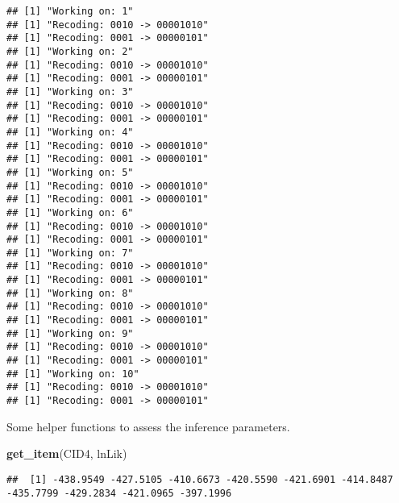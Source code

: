 \documentclass[
]{article}
\newenvironment{Shaded}{\begin{snugshade}}{\end{snugshade}}
\newcommand{\DecValTok}[1]{\textcolor[rgb]{0.00,0.00,0.81}{#1}}
\newcommand{\FunctionTok}[1]{\textcolor[rgb]{0.13,0.29,0.53}{\textbf{#1}}}
\newcommand{\NormalTok}[1]{#1}
\newcommand{\SpecialCharTok}[1]{\textcolor[rgb]{0.81,0.36,0.00}{\textbf{#1}}}
\newcommand{\StringTok}[1]{\textcolor[rgb]{0.31,0.60,0.02}{#1}}
\begin{document}
\begin{verbatim}
## [1] "Working on: 1"
## [1] "Recoding: 0010 -> 00001010"
## [1] "Recoding: 0001 -> 00000101"
## [1] "Working on: 2"
## [1] "Recoding: 0010 -> 00001010"
## [1] "Recoding: 0001 -> 00000101"
## [1] "Working on: 3"
## [1] "Recoding: 0010 -> 00001010"
## [1] "Recoding: 0001 -> 00000101"
## [1] "Working on: 4"
## [1] "Recoding: 0010 -> 00001010"
## [1] "Recoding: 0001 -> 00000101"
## [1] "Working on: 5"
## [1] "Recoding: 0010 -> 00001010"
## [1] "Recoding: 0001 -> 00000101"
## [1] "Working on: 6"
## [1] "Recoding: 0010 -> 00001010"
## [1] "Recoding: 0001 -> 00000101"
## [1] "Working on: 7"
## [1] "Recoding: 0010 -> 00001010"
## [1] "Recoding: 0001 -> 00000101"
## [1] "Working on: 8"
## [1] "Recoding: 0010 -> 00001010"
## [1] "Recoding: 0001 -> 00000101"
## [1] "Working on: 9"
## [1] "Recoding: 0010 -> 00001010"
## [1] "Recoding: 0001 -> 00000101"
## [1] "Working on: 10"
## [1] "Recoding: 0010 -> 00001010"
## [1] "Recoding: 0001 -> 00000101"
\end{verbatim}

Some helper functions to assess the inference parameters.

\begin{Shaded}
\begin{Highlighting}[]
\FunctionTok{get\_item}\NormalTok{(CID4, }\StringTok{\textquotesingle{}lnLik\textquotesingle{}}\NormalTok{)}
\end{Highlighting}
\end{Shaded}

\begin{verbatim}
##  [1] -438.9549 -427.5105 -410.6673 -420.5590 -421.6901 -414.8487 -435.7799 -429.2834 -421.0965 -397.1996
\end{verbatim}

\begin{Shaded}
\end{Shaded}
\end{document}
